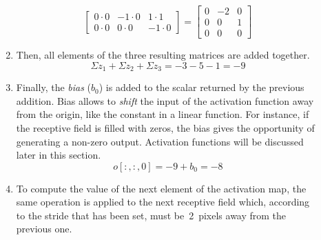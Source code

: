 \begin{description}
\begin{enumerate}
\begin{equation}
\begin{bmatrix}
		0\cdot 0 & -1\cdot 0 & 1\cdot 1\\
		0\cdot 0 & 0\cdot 0 & -1\cdot 0
		\end{bmatrix}=
		\begin{bmatrix}
		0 & -2 & 0\\
		0 & 0 & 1\\
		0 & 0 & 0
		\end{bmatrix}
		\end{equation}		
		\item Then, all elements of the three resulting matrices are added together.
		\begin{equation}
		\Sigma z_1 + \Sigma z_2 + \Sigma z_3 = -3 - 5 -1 = -9
		\end{equation}
		\item Finally, the \emph{bias} ($b_0$) is added to the scalar returned by the previous addition. Bias allows to \emph{shift} the input of the activation function away from the origin, like the constant in a linear function. For instance, if the receptive field is filled with zeros, the bias gives the opportunity of generating a non-zero output. Activation functions will be discussed later in this section.
		\begin{equation}
		o[:,:,0] = -9 + b_0 = -8
		\end{equation}
		\item To compute the value of the next element of the activation map, the same operation is applied to the next receptive field which, according to the stride that has been set, must be~2~pixels away from the previous one.
	\end{enumerate} 
	

\end{description}
